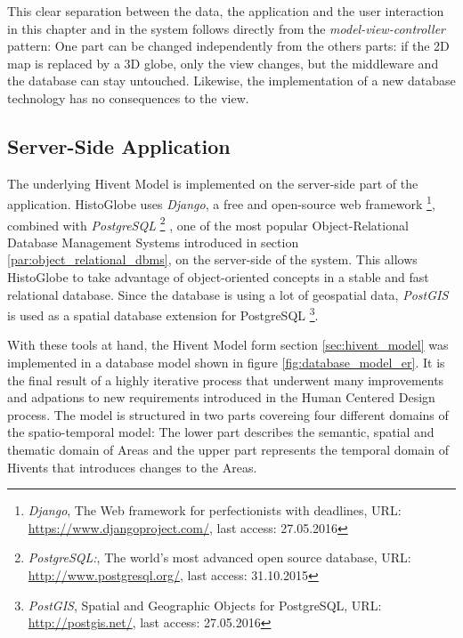This clear separation between the data, the application and the user interaction in this chapter and in the system follows directly from the \emph{model-view-controller} pattern: One part can be changed independently from the others parts: if the 2D map is replaced by a 3D globe, only the view changes, but the middleware and the database can stay untouched. Likewise, the implementation of a new database technology has no consequences to the view.


\subsection{Server-Side Application} %
\label{sub:server_side_application}

The underlying Hivent Model is implemented on the server-side part of the application. HistoGlobe uses \emph{Django}, a free and open-source web framework
\footnote{
  \emph{Django},
  The Web framework for perfectionists with deadlines,
  URL: \url{https://www.djangoproject.com/},
  last access: 27.05.2016
},
combined with \emph{PostgreSQL}
\footnote{
  \emph{PostgreSQL:},
  The world's most advanced open source database,
  URL: \url{http://www.postgresql.org/},
  last access: 31.10.2015
}
, one of the most popular Object-Relational Database Management Systems introduced in section \ref{par:object_relational_dbms}, on the server-side of the system. This allows HistoGlobe to take advantage of object-oriented concepts in a stable and fast relational database. Since the database is using a lot of geospatial data, \emph{PostGIS} is used as a spatial database extension for PostgreSQL
\footnote{
  \emph{PostGIS},
  Spatial and Geographic Objects for PostgreSQL,
  URL: \url{http://postgis.net/},
  last access: 27.05.2016
}.

With these tools at hand, the Hivent Model form section \ref{sec:hivent_model}  was implemented in a database model shown in figure \ref{fig:database_model_er}. It is the final result of a highly iterative process that underwent many improvements and adpations to new requirements introduced in the Human Centered Design process. The model is structured in two parts covereing four different domains of the spatio-temporal model: The lower part describes the semantic, spatial and thematic domain of Areas and the upper part represents the temporal domain of Hivents that introduces changes to the Areas.

